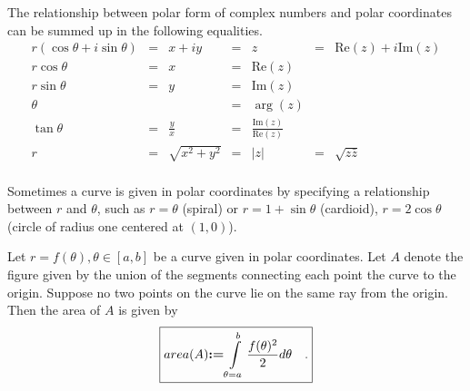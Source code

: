 \documentclass[12pt]{book}
\renewcommand{\Im}{\mathrm{Im}}
\renewcommand{\Re}{\mathrm{Re}}
\newcommand{\eqdef}{\textbf{:=}}
\newcommand{\importantFormula}[1]{\begin{equation} \boxed{#1} \end{equation}}
\newcommand{\optionalDisplay}[1]{}
\begin{document}
The relationship between polar form of complex numbers and polar coordinates can be summed up in the following equalities.
\[
\begin{array}{rclclcl}
r(\cos \theta+i\sin\theta) &=&  x+iy&=& z&=&\Re (z)+i\Im(z)\\
r\cos\theta&=&x&=&\Re(z)\\
r\sin\theta&=&y&=&\Im(z)\\
\theta&&&=& \arg (z)\\
\tan \theta &=&\displaystyle\frac{y}{x}&=&\displaystyle\frac{\Im (z)}{\Re (z)}\\
r&=&\sqrt{x^2+y^2}&=& |z|&=&\sqrt{z\bar z}\\
\end{array}
\]

 Sometimes a curve is given in polar coordinates by specifying a relationship between $r$ and $\theta$, such as $r=\theta$ (spiral) or $r=1+\sin \theta$ (cardioid), $r=2\cos \theta$ (circle of radius one centered at $(1,0)$).

\optionalDisplay{
\psset{xunit=1cm,yunit=1cm}
\begin{pspicture*}(-5,-5)(5,5)
\rput (3,3){$r=\theta$}
\psaxes[labels=none, ticks=x]{<->}(0,0)(-4.5,-4.5)(4.5,4.5)
\parametricplot[linecolor=red, plotpoints=500]{0}{720}{t cos t mul 180 div t sin t mul 180 div } 
\end{pspicture*}

\psset{xunit=1cm,yunit=1cm}
\begin{pspicture*}(-5,-5)(5,5)
\rput (3,3){$r=1+\sin\theta$}
\psaxes[labels=none, ticks=x]{<->}(0,0)(-4.5,-4.5)(4.5,4.5)
\parametricplot[linecolor=red, plotpoints=500]{0}{360}{1 t sin add t cos mul
 1 t sin add t sin mul} 
\end{pspicture*}

\psset{xunit=1cm,yunit=1cm}
\begin{pspicture*}(-5,-5)(5,5)
\rput (3,3){$r=2\cos\theta$}
\psaxes[labels=none, ticks=x]{<->}(0,0)(-4.5,-4.5)(4.5,4.5)
\parametricplot[linecolor=red, plotpoints=500]{0}{360}
{ t cos 2 mul t cos mul
  t cos 2 mul t sin mul} 
\end{pspicture*}
} %

 Let $r=f(\theta), \theta\in [a,b]$ be a curve given in polar coordinates.  Let $A$ denote the figure given by the union of the segments connecting each point the curve to the origin. Suppose no two points on the curve lie on the same ray from the origin. Then the area of $A$ is given by 
\importantFormula{\label{eqAreaUnderPolarCurve}
area(A)\eqdef \int\limits_{\theta=a}^b \frac{f(\theta)^2}{2}d\theta\quad .
}
\end{document}
